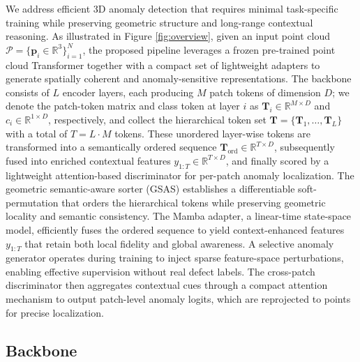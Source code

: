 We address efficient 3D anomaly detection that requires minimal task-specific training while preserving geometric structure and long-range contextual reasoning. As illustrated in Figure \ref{fig:overview}, given an input point cloud \(\mathcal{P} = \{\mathbf{p}_i \in \mathbb{R}^3\}_{i=1}^N\), the proposed pipeline leverages a frozen pre-trained point cloud Transformer together with a compact set of lightweight adapters to generate spatially coherent and anomaly-sensitive representations. The backbone consists of \(L\) encoder layers, each producing \(M\) patch tokens of dimension \(D\); we denote the patch-token matrix and class token at layer \(i\) as \(\mathbf{T}_i \in \mathbb{R}^{M\times D}\) and \(c_i \in \mathbb{R}^{1\times D}\), respectively, and collect the hierarchical token set \(\mathbf{T} = \{\mathbf{T}_1, \dots, \mathbf{T}_L\}\) with a total of \(T = L \cdot M\) tokens. These unordered layer-wise tokens are transformed into a semantically ordered sequence \(\mathbf{T}_{\mathrm{ord}} \in \mathbb{R}^{T\times D}\), subsequently fused into enriched contextual features \(y_{1:T} \in \mathbb{R}^{T\times D}\), and finally scored by a lightweight attention-based discriminator for per-patch anomaly localization. The geometric semantic-aware sorter (GSAS) establishes a differentiable soft-permutation that orders the hierarchical tokens while preserving geometric locality and semantic consistency. The Mamba adapter, a linear-time state-space model, efficiently fuses the ordered sequence to yield context-enhanced features \(y_{1:T}\) that retain both local fidelity and global awareness. A selective anomaly generator operates during training to inject sparse feature-space perturbations, enabling effective supervision without real defect labels. The cross-patch discriminator then aggregates contextual cues through a compact attention mechanism to output patch-level anomaly logits, which are reprojected to points for precise localization. 

\subsection{Backbone}

